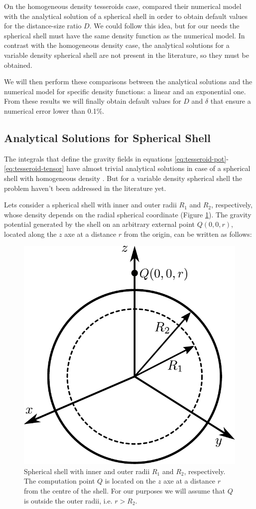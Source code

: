 \documentclass[extra]{gji}
\begin{document}
On the homogeneous density tesseroids case, \citet{Uieda2016} compared 
their numerical model with the analytical solution of a spherical 
shell in order to obtain default values for the distance-size ratio 
$D$.
We could follow this idea, but for our needs the spherical shell must 
have the same density function as the numerical model.
In contrast with the homogeneous density case, the analytical solutions 
for a variable density spherical shell are not present in the 
literature, so they must be obtained.

We will then perform these comparisons between the analytical solutions 
and the numerical model for specific density functions: a linear and an 
exponential one.
From these results we will finally obtain default values for $D$ 
and $\delta$ that ensure a numerical error lower than 0.1\%.


\subsection{Analytical Solutions for Spherical Shell}

The integrals that define the gravity fields in equations 
\ref{eq:tesseroid-pot}-\ref{eq:tesseroid-tensor} have almost trivial 
analytical solutions in case of a spherical shell with homogeneous 
density \citep{Mikuska2006,Grombein2013}.
But for a variable density spherical shell the problem haven't been 
addressed in the literature yet.

Lets consider a spherical shell with inner and outer radii $R_1$ and 
$R_2$, respectively, whose density depends on the radial spherical 
coordinate (Figure \ref{fig:spherical-shell}).
The gravity potential generated by the shell on an arbitrary external 
point $Q(0,0,r)$, located along the $z$ axe at a distance $r$ from the 
origin, can be written as follows:

\begin{figure}
\centering
\includegraphics[width=0.7\linewidth]{figures/spherical-shell.pdf}
\caption{
    Spherical shell with inner and outer radii $R_1$ and $R_2$, respectively.
    The computation point $Q$ is located on the $z$ axe at a distance $r$ from
    the centre of the shell.
    For our purposes we will assume that $Q$ is outside the outer radii,
    i.e. $r > R_2$.
    }
\label{fig:spherical-shell}
\end{figure}
\end{document}
